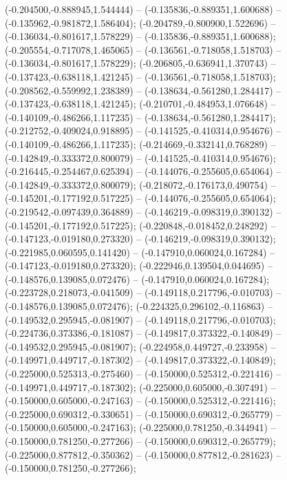  (-0.204500,-0.888945,1.544444) -- (-0.135836,-0.889351,1.600688) -- (-0.135962,-0.981872,1.586404);
 (-0.204789,-0.800900,1.522696) -- (-0.136034,-0.801617,1.578229) -- (-0.135836,-0.889351,1.600688);
 (-0.205554,-0.717078,1.465065) -- (-0.136561,-0.718058,1.518703) -- (-0.136034,-0.801617,1.578229);
 (-0.206805,-0.636941,1.370743) -- (-0.137423,-0.638118,1.421245) -- (-0.136561,-0.718058,1.518703);
 (-0.208562,-0.559992,1.238389) -- (-0.138634,-0.561280,1.284417) -- (-0.137423,-0.638118,1.421245);
 (-0.210701,-0.484953,1.076648) -- (-0.140109,-0.486266,1.117235) -- (-0.138634,-0.561280,1.284417);
 (-0.212752,-0.409024,0.918895) -- (-0.141525,-0.410314,0.954676) -- (-0.140109,-0.486266,1.117235);
 (-0.214669,-0.332141,0.768289) -- (-0.142849,-0.333372,0.800079) -- (-0.141525,-0.410314,0.954676);
 (-0.216445,-0.254467,0.625394) -- (-0.144076,-0.255605,0.654064) -- (-0.142849,-0.333372,0.800079);
 (-0.218072,-0.176173,0.490754) -- (-0.145201,-0.177192,0.517225) -- (-0.144076,-0.255605,0.654064);
 (-0.219542,-0.097439,0.364889) -- (-0.146219,-0.098319,0.390132) -- (-0.145201,-0.177192,0.517225);
 (-0.220848,-0.018452,0.248292) -- (-0.147123,-0.019180,0.273320) -- (-0.146219,-0.098319,0.390132);
 (-0.221985,0.060595,0.141420) -- (-0.147910,0.060024,0.167284) -- (-0.147123,-0.019180,0.273320);
 (-0.222946,0.139504,0.044695) -- (-0.148576,0.139085,0.072476) -- (-0.147910,0.060024,0.167284);
 (-0.223728,0.218073,-0.041509) -- (-0.149118,0.217796,-0.010703) -- (-0.148576,0.139085,0.072476);
 (-0.224325,0.296102,-0.116863) -- (-0.149532,0.295945,-0.081907) -- (-0.149118,0.217796,-0.010703);
 (-0.224736,0.373386,-0.181087) -- (-0.149817,0.373322,-0.140849) -- (-0.149532,0.295945,-0.081907);
 (-0.224958,0.449727,-0.233958) -- (-0.149971,0.449717,-0.187302) -- (-0.149817,0.373322,-0.140849);
 (-0.225000,0.525313,-0.275460) -- (-0.150000,0.525312,-0.221416) -- (-0.149971,0.449717,-0.187302);
 (-0.225000,0.605000,-0.307491) -- (-0.150000,0.605000,-0.247163) -- (-0.150000,0.525312,-0.221416);
 (-0.225000,0.690312,-0.330651) -- (-0.150000,0.690312,-0.265779) -- (-0.150000,0.605000,-0.247163);
 (-0.225000,0.781250,-0.344941) -- (-0.150000,0.781250,-0.277266) -- (-0.150000,0.690312,-0.265779);
 (-0.225000,0.877812,-0.350362) -- (-0.150000,0.877812,-0.281623) -- (-0.150000,0.781250,-0.277266);
